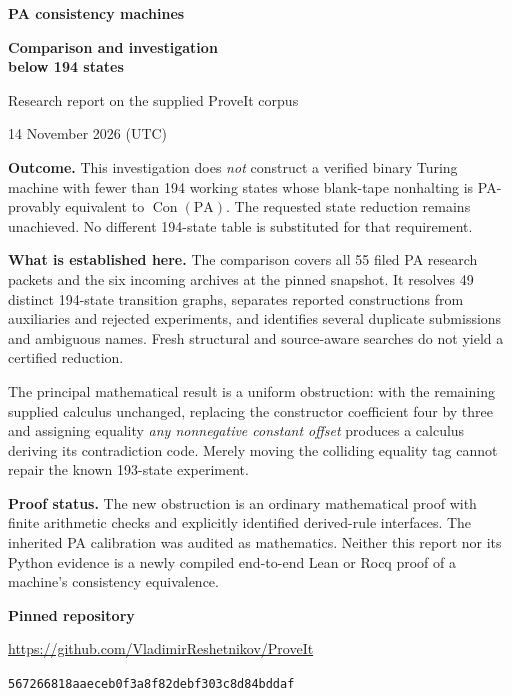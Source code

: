 \documentclass[11pt,letterpaper]{article}
\newcommand{\PA}{\mathrm{PA}}
\newcommand{\Con}{\operatorname{Con}}
\begin{document}
\begin{titlepage}
\vspace*{1cm}
{\Large\bfseries PA consistency machines}\par
\vspace{0.5cm}
{\huge\bfseries Comparison and investigation\\[4pt] below 194 states}\par
\vspace{0.8cm}
{\large Research report on the supplied ProveIt corpus}\par
14 November 2026 (UTC)\par
\vspace{0.8cm}
\textbf{Outcome.} This investigation does \emph{not} construct a verified
binary Turing machine with fewer than 194 working states whose blank-tape
nonhalting is PA-provably equivalent to $\Con(\PA)$. The requested state
reduction remains unachieved. No different 194-state table is substituted
for that requirement.

\textbf{What is established here.} The comparison covers all 55 filed PA
research packets and the six incoming archives at the pinned snapshot.
It resolves 49 distinct 194-state transition graphs, separates reported
constructions from auxiliaries and rejected experiments, and identifies
several duplicate submissions and ambiguous names. Fresh structural and
source-aware searches do not yield a certified reduction.

The principal mathematical result is a uniform obstruction: with the
remaining supplied calculus unchanged, replacing the constructor coefficient
four by three and assigning equality \emph{any nonnegative constant offset}
produces a calculus deriving its contradiction code. Merely moving the
colliding equality tag cannot repair the known 193-state experiment.

\textbf{Proof status.} The new obstruction is an ordinary mathematical
proof with finite arithmetic checks and explicitly identified derived-rule
interfaces. The inherited PA calibration was audited as mathematics.
Neither this report nor its Python evidence is a newly compiled end-to-end
Lean or Rocq proof of a machine's consistency equivalence.

\vfill
\textbf{Pinned repository}\par
\small\url{https://github.com/VladimirReshetnikov/ProveIt}\par
\texttt{567266818aaeceb0f3a8f82debf303c8d84bddaf}\par
\normalsize
\end{titlepage}
\tableofcontents\clearpage
\end{document}

